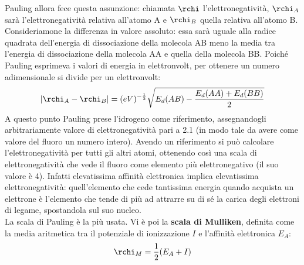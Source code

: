 Pauling allora fece questa assunzione: chiamata $\rchi$ l'elettronegatività, $\rchi_A$ sarà l'elettronegatività relativa all'atomo A e $\rchi_B$ quella relativa all'atomo B. Consideriamone la differenza in valore assoluto: essa sarà uguale alla radice quadrata dell'energia di dissociazione della molecola AB meno la media tra l'energia di dissociazione della molecola AA e quella della molecola BB. Poiché Pauling esprimeva i valori di energia in elettronvolt, per ottenere un numero adimensionale si divide per un elettronvolt:
$$|\rchi_A - \rchi_B| = (eV)^{-\frac{1}{2}}\sqrt{E_d(AB)-\frac{E_d(AA) + E_d(BB)}{2}}$$
A questo punto Pauling prese l'idrogeno come riferimento, assegnandogli arbitrariamente valore di elettronegatività pari a 2.1 (in modo tale da avere come valore del fluoro un numero intero). Avendo un riferimento si può calcolare l'elettronegatività per tutti gli altri atomi, ottenendo così una scala di elettronegatività che vede il fluoro come elemento più elettronegativo (il suo valore è 4). Infatti elevatissima affinità elettronica implica elevatissima elettronegatività: quell'elemento che cede tantissima energia quando acquista un elettrone è l'elemento che tende di più ad attrarre su di sé la carica degli elettroni di legame, spostandola sul suo nucleo.\\

La scala di Pauling è la più usata. Vi è poi la \textbf{scala di Mulliken}, definita come la media aritmetica tra il potenziale di ionizzazione $I$ e l'affinità elettronica $E_A$:
$$\rchi_M=\frac{1}{2}(E_A + I)$$